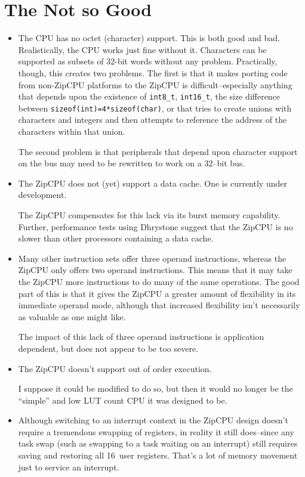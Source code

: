 \documentclass{gqtekspec}
\begin{document}
\section{The Not so Good}
\begin{itemize}
\item The CPU has no octet (character) support. This is both good and bad.
	Realistically, the CPU works just fine without it. Characters can be
	supported as subsets of 32-bit words without any problem. Practically,
	though, this creates two problems.  The first is that it makes porting
	code from non-ZipCPU platforms to the ZipCPU is difficult--especially
	anything that depends upon the existence of {\tt *int8\_t}, 
	{\tt *int16\_t}, the size difference between
	{\tt sizeof(int)=4*sizeof(char)}, or that tries to
	create unions with characters and integers and then attempts to
	reference the address of the characters within that union. 

	The second problem is that peripherals that depend upon character
	support on the bus may need to be rewritten to work on a 32--bit bus.

\item The ZipCPU does not (yet) support a data cache.  One is currently under
	development.

	The ZipCPU compensates for this lack via its burst memory capability.
	Further, performance tests using Dhrystone suggest that the ZipCPU is
	no slower than other processors containing a data cache.

\item Many other instruction sets offer three operand instructions, whereas
	the ZipCPU only offers two operand instructions. This means that it
	may take the ZipCPU more instructions to do many of the same operations.
	The good part of this is that it gives the ZipCPU a greater amount of
	flexibility in its immediate operand mode, although that increased
	flexibility isn't necessarily as valuable as one might like.

	The impact of this lack of three operand instructions is application
	dependent, but does not appear to be too severe.

\item The ZipCPU doesn't support out of order execution.

	I suppose it could be modified to do so, but then it would no longer
	be the ``simple'' and low LUT count CPU it was designed to be.

\item Although switching to an interrupt context in the ZipCPU design doesn't
	require a tremendous swapping of registers, in reality it still
	does--since any task swap (such as swapping to a task waiting on an
	interrupt) still requires saving and restoring all 16~user registers.
	That's a lot of memory movement just to service an interrupt.


\end{itemize}
\end{document}

